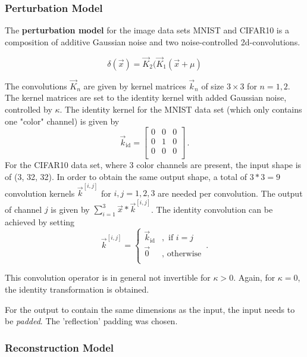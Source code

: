 \subsubsection{Perturbation Model}

The \textbf{perturbation model} for the image data sets MNIST and CIFAR10
is a composition of additive Gaussian noise and two noise-controlled 2d-convolutions.

\[
    \delta(\vec x) = \vec K_2(\vec K_1(\vec x + \mu)
\]

The convolutions $\vec K_n$ are given by kernel matrices $\vec k_n$ of size $3\times3$ for $n=1,2$.
The kernel matrices are set to the identity kernel with added Gaussian noise, controlled by $\kappa$.
The identity kernel for the MNIST data set (which only contains one "color" channel) is given by 
\begin{equation*}
    \vec k_{\text{id}} = \begin{bmatrix}
        0 & 0 & 0 \\
        0 & 1 & 0 \\
        0 & 0 & 0 \\
    \end{bmatrix} \,.
\end{equation*}
For the CIFAR10 data set, where 3 color channels are present, the input shape is of (3, 32, 32). 
In order to obtain the same output shape, 
a total of $3*3=9$ convolution kernels $\vec k^{[i,j]}$ for $i,j=1,2,3$ are needed per convolution.
The output of channel $j$ is given by $\sum_{i=1}^{3} \vec x * \vec k^{[i, j]}$.
The identity convolution can be achieved by setting 
\[
    \vec k^{[i,j]} = \begin{cases}
        \vec k_{\text{id}} &, \text{ if } i = j\\
        \vec 0 &, \text{ otherwise} \\
    \end{cases} \,.
\]

This convolution operator is in general not invertible for $\kappa > 0$.
Again, for $\kappa = 0$, the identity transformation is obtained.

For the output to contain the same dimensions as the input, the input needs to be \textit{padded}.
The 'reflection' padding was chosen.


\subsubsection{Reconstruction Model}

